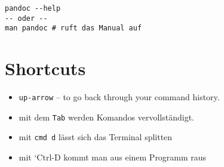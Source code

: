 \documentclass[]{article}
\begin{document}
\begin{verbatim}
pandoc --help
-- oder -- 
man pandoc # ruft das Manual auf
\end{verbatim}

\section{Shortcuts}\label{shortcuts}

\begin{itemize}
\itemsep1pt\parskip0pt
\item
  \texttt{up-arrow} -- to go back through your command history.
\item
  mit dem \texttt{Tab} werden Komandos vervollständigt.
\item
  mit \texttt{cmd d} lässt sich das Terminal splitten
\item
  mit `Ctrl-D kommt man aus einem Programm raus
\end{itemize}
\end{document}
